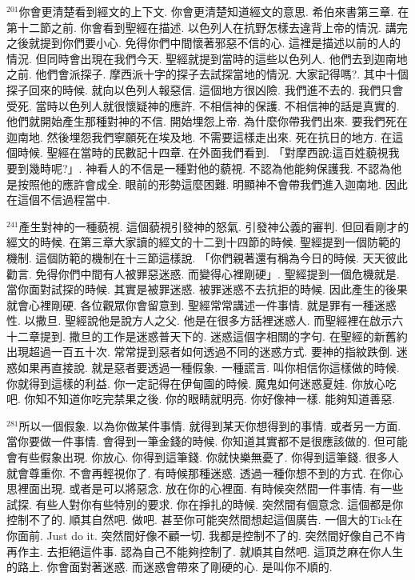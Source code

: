 \documentclass{book}
\begin{document}
$^{201}$你會更清楚看到經文的上下文.
你會更清楚知道經文的意思.
希伯來書第三章.
在第十二節之前.
你會看到聖經在描述.
以色列人在抗野怎樣去違背上帝的情況.
講完之後就提到你們要小心.
免得你們中間懷著邪惡不信的心.
這裡是描述以前的人的情況.
但同時會出現在我們今天.
聖經就提到當時的這些以色列人.
他們去到迦南地之前.
他們會派探子.
摩西派十字的探子去試探當地的情況.
大家記得嗎?.
其中十個探子回來的時候.
就向以色列人報惡信.
這個地方很凶險.
我們進不去的.
我們只會受死.
當時以色列人就很懷疑神的應許.
不相信神的保護.
不相信神的話是真實的.
他們就開始產生那種對神的不信.
開始埋怨上帝.
為什麼你帶我們出來.
要我們死在迦南地.
然後埋怨我們寧願死在埃及地.
不需要這樣走出來.
死在抗日的地方.
在這個時候.
聖經在當時的民數記十四章.
在外面我們看到.
「對摩西說:這百姓藐視我要到幾時呢?」.
神看人的不信是一種對他的藐視.
不認為他能夠保護我.
不認為他是按照他的應許會成全.
眼前的形勢這麼困難.
明顯神不會帶我們進入迦南地.
因此在這個不信過程當中.

$^{241}$產生對神的一種藐視.
這個藐視引發神的怒氣.
引發神公義的審判.
但回看剛才的經文的時候.
在第三章大家讀的經文的十二到十四節的時候.
聖經提到一個防範的機制.
這個防範的機制在十三節這樣說.
「你們親著還有稱為今日的時候.
天天彼此勸言.
免得你們中間有人被罪惡迷惑.
而變得心裡剛硬」.
聖經提到一個危機就是.
當你面對試探的時候.
其實是被罪迷惑.
被罪迷惑不去抗拒的時候.
因此產生的後果就會心裡剛硬.
各位觀眾你會留意到.
聖經常常講述一件事情.
就是罪有一種迷惑性.
以撒旦.
聖經說他是說方人之父.
他是在很多方話裡迷惑人.
而聖經裡在啟示六十二章提到.
撒旦的工作是迷惑普天下的.
迷惑這個字相關的字句.
在聖經的新舊約出現超過一百五十次.
常常提到惡者如何透過不同的迷惑方式.
要神的指紋跌倒.
迷惑如果再直接說.
就是惡者要透過一種假象.
一種謊言.
叫你相信你這樣做的時候.
你就得到這樣的利益.
你一定記得在伊甸園的時候.
魔鬼如何迷惑夏娃.
你放心吃吧.
你知不知道你吃完禁果之後.
你的眼睛就明亮.
你好像神一樣.
能夠知道善惡.

$^{281}$所以一個假象.
以為你做某件事情.
就得到某天你想得到的事情.
或者另一方面.
當你要做一件事情.
會得到一筆金錢的時候.
你知道其實都不是很應該做的.
但可能會有些假象出現.
你放心.
你得到這筆錢.
你就快樂無憂了.
你得到這筆錢.
很多人就會尊重你.
不會再輕視你了.
有時候那種迷惑.
透過一種你想不到的方式.
在你心思裡面出現.
或者是可以將惡念.
放在你的心裡面.
有時候突然間一件事情.
有一些試探.
有些人對你有些特別的要求.
你在掙扎的時候.
突然間有個意念.
這個都是你控制不了的.
順其自然吧.
做吧.
甚至你可能突然間想起這個廣告.
一個大的Tick在你面前.
Just do it.
突然間好像不顧一切.
我都是控制不了的.
突然間好像自己不肯再作主.
去拒絕這件事.
認為自己不能夠控制了.
就順其自然吧.
這頂芝麻在你人生的路上.
你會面對著迷惑.
而迷惑會帶來了剛硬的心.
是叫你不順的.
\end{document}
